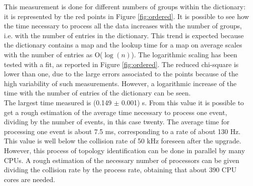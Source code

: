 %
This measurement is done for different numbers of groups within the dictionary: it is represented by the red points in Figure \ref{fig:ordered}. It is possible to see how the time necessary to process all the data increases with the number of groups, i.e. with the number of entries in the dictionary. This trend is expected because the dictionary contains a map and the lookup time for a map on average scales with the number of entries as O($\log(n)$). The logarithmic scaling has been tested with a fit, as reported in Figure \ref{fig:ordered}. The reduced chi-square is lower than one, due to the large errors associated to the points because of the high variability of such measurements. However, a logarithmic increase of the time with the number of entries of the dictionary can be seen.\\   
The largest time measured is (0.149 $\pm$ 0.001) s. From this value it is possible to get a rough estimation of the average time necessary to process one event, dividing by the number of events, in this case twenty. The average time for processing one event is about 7.5 ms, corresponding to a rate of about 130 Hz. This value is well below the collision rate of 50 kHz foreseen after the upgrade. However, this process of topology identification can be done in parallel by many CPUs. A rough estimation of the necessary number of processors can be given dividing the collision rate by the process rate, obtaining that about 390 CPU cores are needed. %
